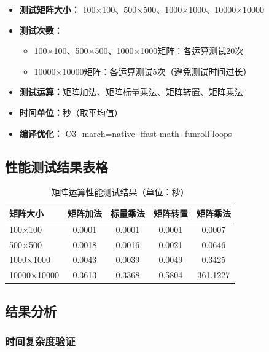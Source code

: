 \documentclass[12pt,a4paper]{article}
\begin{document}
\begin{itemize}
    \item \textbf{测试矩阵大小：} 100×100、500×500、1000×1000、10000×10000
    \item \textbf{测试次数：}
    \begin{itemize}
        \item 100×100、500×500、1000×1000矩阵：各运算测试20次
        \item 10000×10000矩阵：各运算测试5次（避免测试时间过长）
    \end{itemize}
    \item \textbf{测试运算：}矩阵加法、矩阵标量乘法、矩阵转置、矩阵乘法
    \item \textbf{时间单位：}秒（取平均值）
    \item \textbf{编译优化：}-O3 -march=native -ffast-math -funroll-loops
\end{itemize}

\subsection{性能测试结果表格}

\begin{table}[h]
\centering
\caption{矩阵运算性能测试结果（单位：秒）}
\label{tab:performance}
\begin{tabular}{lcccc}
\toprule
\textbf{矩阵大小} & \textbf{矩阵加法} & \textbf{标量乘法} & \textbf{矩阵转置} & \textbf{矩阵乘法} \\
\midrule
100×100   & 0.0001 & 0.0001 & 0.0001 & 0.0007 \\
500×500   & 0.0018 & 0.0016 & 0.0021 & 0.0646 \\
1000×1000 & 0.0043 & 0.0039 & 0.0049 & 0.3425 \\
10000×10000 & 0.3613 & 0.3368 & 0.5804 & 361.1227 \\
\bottomrule
\end{tabular}
\end{table}

\subsection{结果分析}

\subsubsection{时间复杂度验证}
\end{document}
